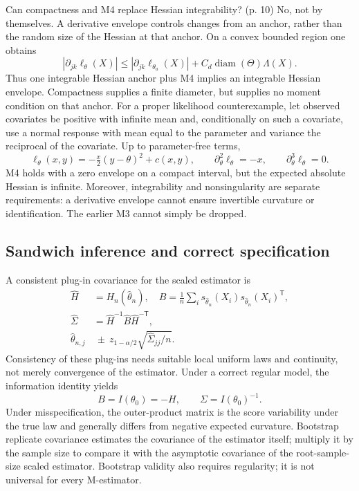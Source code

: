\documentclass[12pt]{article}
\begin{document}
\begin{todobox}{Can compactness and M4 replace Hessian integrability? (p. 10)}
No, not by themselves. A derivative envelope controls changes from an
anchor, rather than the random size of the Hessian at that anchor. On a
convex bounded region one obtains
\begin{equation}
 |\partial_{jk}\ell_\theta(X)|
 \le |\partial_{jk}\ell_{\theta_a}(X)|
       +C_d\operatorname{diam}(\Theta)\Lambda(X).
\end{equation}
Thus one integrable Hessian anchor plus M4 implies an integrable Hessian
envelope. Compactness supplies a finite diameter, but supplies no moment
condition on that anchor. For a proper likelihood counterexample, let
observed covariates be positive with infinite mean and, conditionally on
such a covariate, use a normal response with mean equal to the parameter
and variance the reciprocal of the covariate. Up to parameter-free terms,
\begin{equation}
 \ell_\theta(x,y)=-\tfrac{x}{2}(y-\theta)^2+c(x,y),\qquad
 \partial_\theta^2\ell_\theta=-x,\qquad
 \partial_\theta^3\ell_\theta=0.
\end{equation}
M4 holds with a zero envelope on a compact interval, but the expected
absolute Hessian is infinite. Moreover, integrability and nonsingularity
are separate requirements: a derivative envelope cannot ensure invertible
curvature or identification. The earlier M3 cannot simply be dropped.
\end{todobox}

\subsection{Sandwich inference and correct specification}
A consistent plug-in covariance for the scaled estimator is
\begin{align}
 \widehat H&=H_n(\widehat\theta_n),\quad
 \widehat B=\frac1n\sum_i s_{\widehat\theta_n}(X_i)
 s_{\widehat\theta_n}(X_i)^{\mathsf T},\\
 \widehat\Sigma&=\widehat H^{-1}\widehat B\widehat H^{-\mathsf T},\\
 \widehat\theta_{n,j}&\ \pm\ z_{1-\alpha/2}\sqrt{\widehat\Sigma_{jj}/n}.
\end{align}
Consistency of these plug-ins needs suitable local uniform laws and
continuity, not merely convergence of the estimator. Under a correct
regular model, the information identity yields
\begin{equation}
 B=I(\theta_0)=-H,\qquad\Sigma=I(\theta_0)^{-1}.
\end{equation}
Under misspecification, the outer-product matrix is the score variability
under the true law and generally differs from negative expected curvature.
Bootstrap replicate covariance estimates the covariance of the estimator
itself; multiply it by the sample size to compare it with the asymptotic
covariance of the root-sample-size scaled estimator. Bootstrap validity
also requires regularity; it is not universal for every M-estimator.
\end{document}
